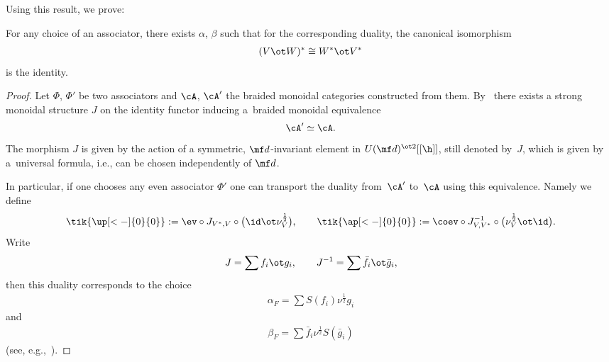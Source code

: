 Using this result, we prove:
\begin{prop}\label{prop:dual}
For any choice of an associator, there exists $\alpha$, $\beta$ such that for the corresponding duality, the canonical isomorphism
\begin{gather*}
		(V \ot W)^*\cong W^* \ot V^*
\end{gather*}
is the identity.
\end{prop}
\begin{proof}
	Let $\Phi$, $\Phi'$ be two associators and $\cA$, $\cA'$ the braided monoidal categories constructed from them. By~\cite{Drinfeld1990a,Le1996} there exists a strong monoidal structure $J$ on the identity functor inducing a~braided monoidal equivalence
\begin{gather*}
\cA' \simeq \cA.
\end{gather*}
The morphism $J$ is given by the action of a symmetric, $\mf d$-invariant element in $U(\mf d)^{\ot 2}[[\h]]$, still denoted by~$J$, which is given by a~universal formula, i.e., can be chosen independently of $\mf d$.

In particular, if one chooses any even associator $\Phi'$ one can transport the duality from~$\cA'$ to~$\cA$ using this equivalence. Namely we def\/ine
\begin{gather*}
	\tik{\up[<-]{0}{0}} :=	\ev\circ J_{V^*,V} 	\circ \big(\id \ot \nu^{\frac12}_V\big),\qquad  \tik{\ap[<-]{0}{0}} :=\coev\circ J^{-1}_{V,V^*} \circ \big(\nu^{\frac12}_V \ot \id\big).
\end{gather*}
Write
\begin{gather*}
	J =\sum f_i \ot g_i,\qquad J^{-1} =\sum \bar f_i \ot \bar g_i,
\end{gather*}
then this duality corresponds to the choice
\begin{gather*}
	\alpha_F=\sum S(f_i)\nu^{\frac12}g_i
\end{gather*} and
\begin{gather*}
	\beta_F=\sum \bar f_i \nu^{\frac12} S(\bar g_i)
\end{gather*}
(see, e.g.,~\cite{Drinfeld1990}).


\end{proof}
